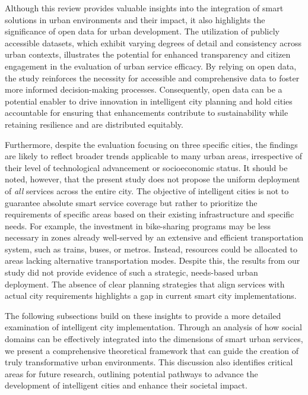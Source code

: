 \documentclass[smartcities,article,submit,pdftex,moreauthors]{Definitions/mdpi}
\begin{document}
Although this review provides valuable insights into the integration of smart solutions in urban environments and their impact, it also highlights the significance of open data for urban development. The utilization of publicly accessible datasets, which exhibit varying degrees of detail and consistency across urban contexts, illustrates the potential for enhanced transparency and citizen engagement in the evaluation of urban service efficacy. By relying on open data, the study reinforces the necessity for accessible and comprehensive data to foster more informed decision-making processes. Consequently, open data can be a potential enabler to drive innovation in intelligent city planning and hold cities accountable for ensuring that enhancements contribute to sustainability while retaining resilience and are distributed equitably. 

Furthermore, despite the evaluation focusing on three specific cities, the findings are likely to reflect broader trends applicable to many urban areas, irrespective of their level of technological advancement or socioeconomic status. It should be noted, however, that the present study does not propose the uniform deployment of \textit{all} services across the entire city. The objective of intelligent cities is not to guarantee absolute smart service coverage but rather to prioritize the requirements of specific areas based on their existing infrastructure and specific needs. For example, the investment in bike-sharing programs may be less necessary in zones already well-served by an extensive and efficient transportation system, such as trains, buses, or metros. Instead, resources could be allocated to areas lacking alternative transportation modes. Despite this, the results from our study did not provide evidence of such a strategic, needs-based urban deployment. The absence of clear planning strategies that align services with actual city requirements highlights a gap in current smart city implementations.

The following subsections build on these insights to provide a more detailed examination of intelligent city implementation. Through an analysis of how social domains can be effectively integrated into the dimensions of smart urban services, we present a comprehensive theoretical framework that can guide the creation of truly transformative urban environments. This discussion also identifies critical areas for future research, outlining potential pathways to advance the development of intelligent cities and enhance their societal impact.
\end{document}
